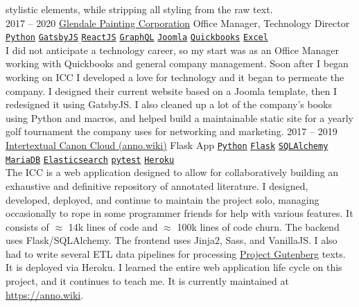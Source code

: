 \documentclass[9pt]{developercv} %
\begin{document}
\begin{entrylist}
{            stylistic elements, while stripping all styling from the raw text.\\
        }
    \entry
        {2017 -- 2020}
        {{\href{https://glendalepainting.com/}{Glendale Painting Corporation}}}
        {Office Manager, Technology Director}
        {
            \texttt{{\href{https://www.python.org/}{Python}}}\slashsep
            \texttt{{\href{https://www.gatsbyjs.org/}{GatsbyJS}}}\slashsep
            \texttt{{\href{https://reactjs.org/}{ReactJS}}}\slashsep
            \texttt{{\href{https://graphql.org/}{GraphQL}}}\slashsep
            \texttt{{\href{https://www.joomla.org/}{Joomla}}}\slashsep
            \texttt{{\href{https://quickbooks.intuit.com/}{Quickbooks}}}\slashsep
            \texttt{{\href{https://www.microsoft.com/en-us/microsoft-365/excel}{Excel}}}\\
            I did not anticipate a technology career, so my start was as an
            Office Manager working with Quickbooks and general company
            management. Soon after I began working on ICC I developed a love for
            technology and it began to permeate the company. I designed their
            current website based on a Joomla template, then I redesigned it
            using GatsbyJS. I also cleaned up a lot of the company's books using
            Python and macros, and helped build a maintainable static site
            for a yearly golf tournament the company uses for networking and
            marketing.
        }
    \entry
        {2017 -- 2019}
        {{\href{https://github.com/Anno-Wiki/icc}{Intertextual Canon Cloud (anno.wiki)}}}
        {Flask App}
        {
            \texttt{{\href{https://www.python.org/}{Python}}}\slashsep
            \texttt{{\href{https://flask.palletsprojects.com/en/1.1.x/}{Flask}}}\slashsep
            \texttt{{\href{https://www.sqlalchemy.org/}{SQLAlchemy}}}\slashsep
            \texttt{{\href{https://mariadb.org/}{MariaDB}}}\slashsep
            \texttt{{\href{https://www.elastic.co/}{Elasticsearch}}}\slashsep
            \texttt{{\href{https://docs.pytest.org/en/stable/}{pytest}}}\slashsep
            \texttt{{\href{https://www.heroku.com/}{Heroku}}}\\
            The ICC is a web application designed to allow for collaboratively
            building an exhaustive and definitive repository of annotated
            literature. I designed, developed, deployed, and continue to
            maintain the project solo, managing occasionally to rope in some
            programmer friends for help with various features. It consists of
            $\approx$ 14k lines of code and $\approx$ 100k lines of code churn.
            The backend uses Flask/SQLAlchemy. The frontend uses Jinja2, Sass,
            and VanillaJS. I also had to write several ETL data pipelines for
            processing {\href{https://gutenberg.org}{Project Gutenberg}} texts.
            It is deployed via Heroku. I learned the entire web application life
            cycle on this project, and it continues to teach me. It is currently
            maintained at {\href{https://anno.wiki}{https://anno.wiki}}.
        }
\end{entrylist}
\end{document}
